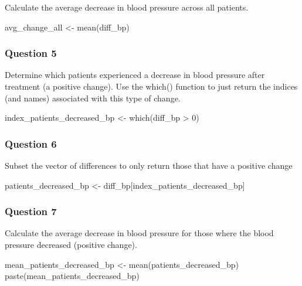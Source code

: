\documentclass[
  letterpaper,
  DIV=11,
  numbers=noendperiod]{scrartcl}
\newenvironment{Shaded}{\begin{snugshade}}{\end{snugshade}}
\newcommand{\DecValTok}[1]{\textcolor[rgb]{0.68,0.00,0.00}{#1}}
\newcommand{\FunctionTok}[1]{\textcolor[rgb]{0.28,0.35,0.67}{#1}}
\newcommand{\NormalTok}[1]{\textcolor[rgb]{0.00,0.23,0.31}{#1}}
\newcommand{\OtherTok}[1]{\textcolor[rgb]{0.00,0.23,0.31}{#1}}
\newcommand{\SpecialCharTok}[1]{\textcolor[rgb]{0.37,0.37,0.37}{#1}}
\begin{document}
Calculate the average decrease in blood pressure across all patients.

\begin{Shaded}
\begin{Highlighting}[]
\NormalTok{avg\_change\_all }\OtherTok{\textless{}{-}} \FunctionTok{mean}\NormalTok{(diff\_bp)}
\end{Highlighting}
\end{Shaded}

\subsubsection{Question 5}\label{question-5}

Determine which patients experienced a decrease in blood pressure after
treatment (a positive change). Use the which() function to just return
the indices (and names) associated with this type of change.

\begin{Shaded}
\begin{Highlighting}[]
\NormalTok{index\_patients\_decreased\_bp }\OtherTok{\textless{}{-}} \FunctionTok{which}\NormalTok{(diff\_bp }\SpecialCharTok{\textgreater{}} \DecValTok{0}\NormalTok{)}
\end{Highlighting}
\end{Shaded}

\subsubsection{Question 6}\label{question-6}

Subset the vector of differences to only return those that have a
positive change

\begin{Shaded}
\begin{Highlighting}[]
\NormalTok{patients\_decreased\_bp }\OtherTok{\textless{}{-}}\NormalTok{ diff\_bp[index\_patients\_decreased\_bp]}
\end{Highlighting}
\end{Shaded}

\subsubsection{Question 7}\label{question-7}

Calculate the average decrease in blood pressure for those where the
blood pressure decreased (positive change).

\begin{Shaded}
\begin{Highlighting}[]
\NormalTok{mean\_patients\_decreased\_bp }\OtherTok{\textless{}{-}} \FunctionTok{mean}\NormalTok{(patients\_decreased\_bp)}
\FunctionTok{paste}\NormalTok{(mean\_patients\_decreased\_bp)}
\end{Highlighting}
\end{Shaded}
\end{document}
